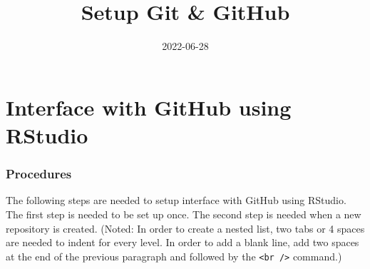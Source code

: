 \documentclass[
]{article}
\title{Setup Git \& GitHub}
\author{}
\date{\vspace{-2.5em}2022-06-28}
\begin{document}
\maketitle

\hypertarget{interface-with-github-using-rstudio}{%
\section{Interface with GitHub using
RStudio}\label{interface-with-github-using-rstudio}}

\hypertarget{procedures}{%
\subsubsection{Procedures}\label{procedures}}

The following steps are needed to setup interface with GitHub using
RStudio. The first step is needed to be set up once. The second step is
needed when a new repository is created. (Noted: In order to create a
nested list, two tabs or 4 spaces are needed to indent for every level.
In order to add a blank line, add two spaces at the end of the previous
paragraph and followed by the \texttt{\textless{}br\ /\textgreater{}}
command.)
\end{document}
